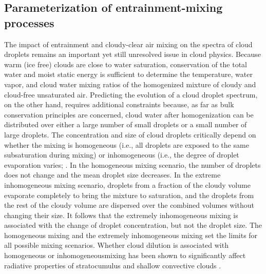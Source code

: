 \documentclass[draft,jgrga]{AGUTeX}
\begin{document}
\begin{article}
\subsection{Parameterization of entrainment-mixing processes}
The impact of entrainment and cloudy-clear air mixing on the spectra of cloud droplets remains an important yet still unresolved issue in cloud physics. Because warm (ice free)
clouds are close to water saturation, conservation of the total water and moist static energy is sufficient to determine the temperature, water vapor, and cloud water mixing ratios of the homogenized mixture of cloudy and cloud-free unsaturated air. Predicting the evolution of a cloud droplet spectrum, on the other hand, requires additional constraints because, as far as bulk conservation principles are concerned, cloud water after homogenization can be distributed over either a large number of small droplets or a small number of large droplets. The concentration and size of cloud droplets critically depend on whether the mixing is homogeneous (i.e., all droplets are exposed to the same subsaturation during mixing) or inhomogeneous (i.e., the degree of droplet evaporation varies; \cite{Baker1979, Baker1980, Burnet2007Observational}. In the homogeneous mixing scenario, the number of droplets does not change and the mean droplet size decreases. In the extreme inhomogeneous mixing scenario, droplets from a fraction of the cloudy volume evaporate completely to bring the mixture to saturation, and the droplets from the rest of the cloudy volume are dispersed over the combined volumes without
changing their size. It follows that the extremely inhomogeneous mixing is associated with the change of droplet concentration, but not the droplet size. The homogeneous mixing and the extremely inhomogeneous mixing set the limits for all possible mixing scenarios. Whether cloud dilution is associated with homogeneous or inhomogeneousmixing has been shown to significantly affect radiative properties of stratocumulus \cite{Chosson2007} and shallow convective clouds \cite{Grabowski2006, Slawinska2008}.


\end{article}
\end{document}
